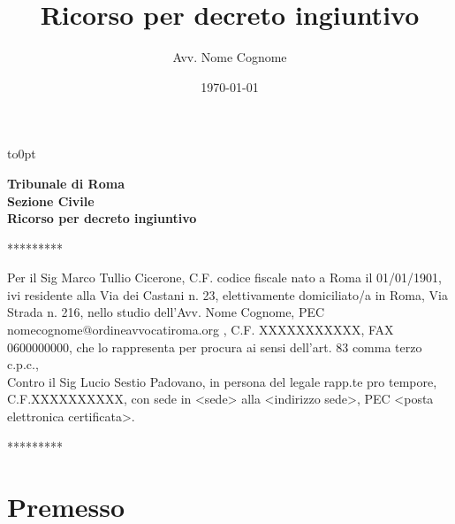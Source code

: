 \documentclass [12pt]{article}
\newcommand{\trib}{Tribunale di Roma}
\newcommand{\sez}{Sezione Civile}
\newcommand{\ric}{Marco Tullio Cicerone}\label{ricorrente}
\newcommand{\res}{Lucio Sestio Padovano}\label{resistente}
\begin{document}
\author{Avv. Nome Cognome}
\title{Ricorso per decreto ingiuntivo}
\date{\today}
	\vspace*{-1cm}\vbox to0pt{
		\vss\vbox{	
			}
		\vspace{.1cm}}
\begin{center}
\textbf{\textbf{\trib\\
\sez\\
Ricorso per decreto ingiuntivo}}
\end{center}
\tableofcontents
\begin{center}
*********
\end{center}
Per il Sig \ric ,  C.F. codice fiscale nato a Roma il 01/01/1901, ivi residente alla Via dei Castani n. 23, elettivamente domiciliato/a in Roma, Via Strada n. 216, nello studio dell'Avv. Nome Cognome, PEC nomecognome@ordineavvocatiroma.org , C.F. XXXXXXXXXXX,  FAX 0600000000, che lo rappresenta per procura ai sensi dell'art. 83 comma terzo c.p.c.,\\
Contro il Sig \res , in persona del legale rapp.te pro tempore, C.F.XXXXXXXXXX, con sede in <sede> alla <indirizzo sede>, PEC <posta elettronica certificata>.
\begin{center}
*********
\end{center}
\section{Premesso}\label{premesso} 
\end{document}
